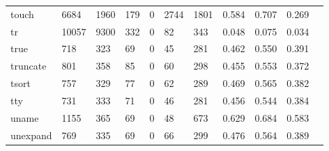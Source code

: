 \begin{longtable}{lp{1.10cm}p{1.10cm}p{1.10cm}p{1.10cm}p{1.10cm}p{1.10cm}p{1.10cm}p{1.10cm}p{1.10cm}p{1.10cm}}
touch     &                   6684 &                               1960 &                               179 &                                0 &                              2744 &                            1801 &                          0.584 &                                 0.707 &                               0.269 \\
tr        &                  10057 &                               9300 &                               332 &                                0 &                                82 &                             343 &                          0.048 &                                 0.075 &                               0.034 \\
true      &                    718 &                                323 &                                69 &                                0 &                                45 &                             281 &                          0.462 &                                 0.550 &                               0.391 \\
truncate  &                    801 &                                358 &                                85 &                                0 &                                60 &                             298 &                          0.455 &                                 0.553 &                               0.372 \\
tsort     &                    757 &                                329 &                                77 &                                0 &                                62 &                             289 &                          0.469 &                                 0.565 &                               0.382 \\
tty       &                    731 &                                333 &                                71 &                                0 &                                46 &                             281 &                          0.456 &                                 0.544 &                               0.384 \\
uname     &                   1155 &                                365 &                                69 &                                0 &                                48 &                             673 &                          0.629 &                                 0.684 &                               0.583 \\
unexpand  &                    769 &                                335 &                                69 &                                0 &                                66 &                             299 &                          0.476 &                                 0.564 &                               0.389 \\

\end{longtable}
